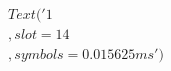 \documentclass[preview]{standalone}
\begin{document}
\begin{align*}
Text('1\\,slot = 14\\, symbols = 0.015625 ms')
\end{align*}
\end{document}
